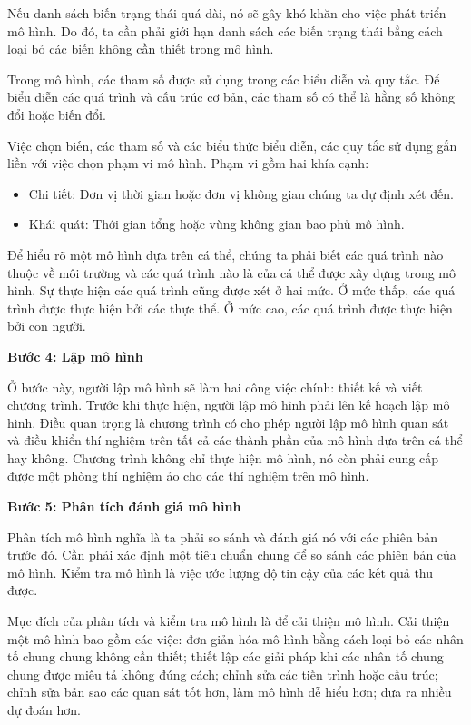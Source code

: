 \documentclass[13pt]{extreport}
\begin{document}
Nếu danh sách biến trạng thái quá dài, nó sẽ gây khó khăn cho việc phát triển mô hình. Do đó, ta cần phải giới hạn danh sách các biến trạng thái bằng cách loại bỏ các biến không cần thiết trong mô hình.

Trong mô hình, các tham số được sử dụng trong các biểu diễn và quy tắc. Để biểu diễn các quá trình và cấu trúc cơ bản, các tham số có thể là hằng số không đổi hoặc biến đổi.

Việc chọn biến, các tham số và các biểu thức biểu diễn, các quy tắc sử dụng gắn liền với việc chọn phạm vi mô hình. Phạm vi gồm hai khía cạnh:
\begin{itemize}
\item Chi tiết: Đơn vị thời gian hoặc đơn vị không gian chúng ta dự định xét đến.
\item Khái quát: Thới gian tổng hoặc vùng không gian bao phủ mô hình.
\end{itemize}
Để hiểu rõ một mô hình dựa trên cá thể, chúng ta phải biết các quá trình nào thuộc về môi trường và các quá trình nào là của cá thể được xây dựng trong mô hình. Sự thực hiện các quá trình cũng được xét ở hai mức. Ở mức thấp, các quá trình được thực hiện bởi các thực thể. Ở mức cao, các quá trình được thực hiện bởi con người.

\textbf{Bước 4: Lập mô hình}

Ở bước này, người lập mô hình sẽ làm hai công việc chính: thiết kế và viết chương trình. Trước khi thực hiện, người lập mô hình phải lên kế hoạch lập mô hình. Điều quan trọng là chương trình có cho phép người lập mô hình quan sát và điều khiển thí nghiệm trên tất cả các thành phần của mô hình dựa trên cá thể hay không. Chương trình không chỉ thực hiện mô hình, nó còn phải cung cấp được một phòng thí nghiệm ảo cho các thí nghiệm trên mô hình.

\textbf{Bước 5: Phân tích đánh giá mô hình}

Phân tích mô hình nghĩa là ta phải so sánh và đánh giá nó với các phiên bản trước đó. Cần phải xác định một tiêu chuẩn chung để so sánh các phiên bản của mô hình. Kiểm tra mô hình là việc ước lượng độ tin cậy của các kết quả thu được.

Mục đích của phân tích và kiểm tra mô hình là để cải thiện mô hình. Cải thiện một mô hình bao gồm các việc: đơn giản hóa mô hình bằng cách loại bỏ các nhân tố chung chung không cần thiết; thiết lập các giải pháp khi các nhân tố chung chung được miêu tả không đúng cách; chỉnh sửa các tiến trình hoặc cấu trúc; chỉnh sửa bản sao các quan sát tốt hơn, làm mô hình dễ hiểu hơn; đưa ra nhiều dự đoán hơn.
\end{document}
